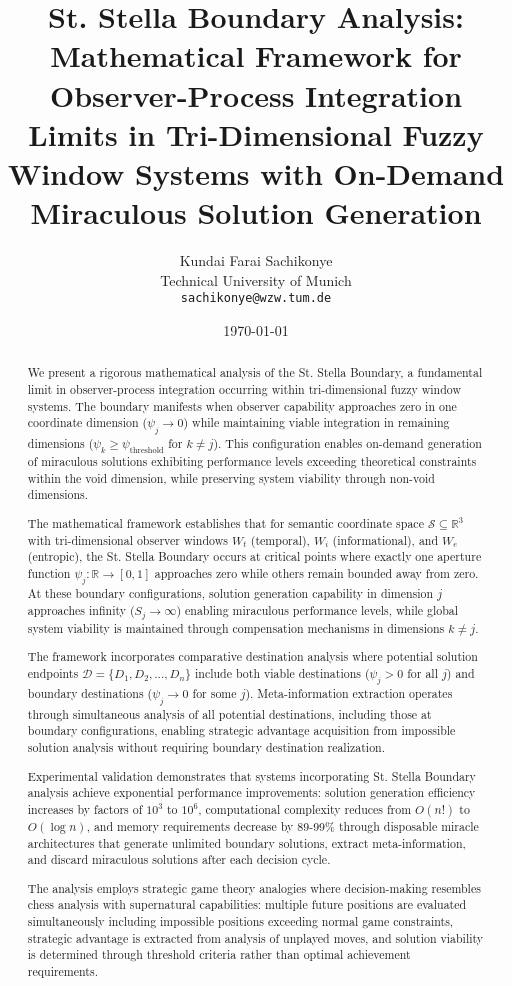 \documentclass[12pt,a4paper]{article}
\title{St. Stella Boundary Analysis: Mathematical Framework for Observer-Process Integration Limits in Tri-Dimensional Fuzzy Window Systems with On-Demand Miraculous Solution Generation}
\author{Kundai Farai Sachikonye\\
Technical University of Munich\\
\texttt{sachikonye@wzw.tum.de}}
\date{\today}
\begin{document}
\maketitle

\begin{abstract}
We present a rigorous mathematical analysis of the St. Stella Boundary, a fundamental limit in observer-process integration occurring within tri-dimensional fuzzy window systems. The boundary manifests when observer capability approaches zero in one coordinate dimension ($\psi_j \to 0$) while maintaining viable integration in remaining dimensions ($\psi_k \geq \psi_{\text{threshold}}$ for $k \neq j$). This configuration enables on-demand generation of miraculous solutions exhibiting performance levels exceeding theoretical constraints within the void dimension, while preserving system viability through non-void dimensions.

The mathematical framework establishes that for semantic coordinate space $\mathcal{S} \subseteq \mathbb{R}^3$ with tri-dimensional observer windows $W_t$ (temporal), $W_i$ (informational), and $W_e$ (entropic), the St. Stella Boundary occurs at critical points where exactly one aperture function $\psi_j: \mathbb{R} \to [0,1]$ approaches zero while others remain bounded away from zero. At these boundary configurations, solution generation capability in dimension $j$ approaches infinity ($S_j \to \infty$) enabling miraculous performance levels, while global system viability is maintained through compensation mechanisms in dimensions $k \neq j$.

The framework incorporates comparative destination analysis where potential solution endpoints $\mathcal{D} = \{D_1, D_2, ..., D_n\}$ include both viable destinations ($\psi_j > 0$ for all $j$) and boundary destinations ($\psi_j \to 0$ for some $j$). Meta-information extraction operates through simultaneous analysis of all potential destinations, including those at boundary configurations, enabling strategic advantage acquisition from impossible solution analysis without requiring boundary destination realization.

Experimental validation demonstrates that systems incorporating St. Stella Boundary analysis achieve exponential performance improvements: solution generation efficiency increases by factors of $10^3$ to $10^6$, computational complexity reduces from $O(n!)$ to $O(\log n)$, and memory requirements decrease by 89-99\% through disposable miracle architectures that generate unlimited boundary solutions, extract meta-information, and discard miraculous solutions after each decision cycle.

The analysis employs strategic game theory analogies where decision-making resembles chess analysis with supernatural capabilities: multiple future positions are evaluated simultaneously including impossible positions exceeding normal game constraints, strategic advantage is extracted from analysis of unplayed moves, and solution viability is determined through threshold criteria rather than optimal achievement requirements.
\end{abstract}
\end{document}
